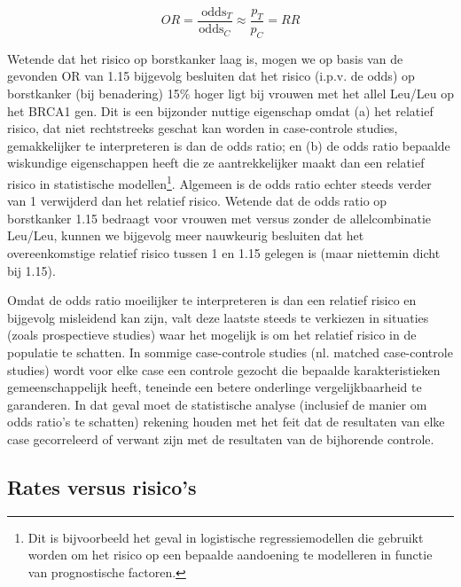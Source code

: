 \documentclass[
  12pt,dutch,coursenotes]{book}
\theoremstyle{definition}
\theoremstyle{definition}
\theoremstyle{definition}
\theoremstyle{remark}
\begin{document}
\begin{equation*}
OR=\frac{\mbox{ odds}_T}{\mbox{
odds}_C}\approx \frac{p_T}{p_C}=RR
\end{equation*}

Wetende dat het risico op borstkanker laag is, mogen we
op basis van de gevonden OR van 1.15 bijgevolg
besluiten dat het risico (i.p.v. de odds) op borstkanker (bij benadering) 15\% hoger ligt bij vrouwen met het allel Leu/Leu op het BRCA1 gen. Dit is een bijzonder
nuttige eigenschap omdat (a) het relatief risico, dat niet rechtstreeks
geschat kan worden in case-controle studies, gemakkelijker te interpreteren
is dan de odds ratio; en (b) de odds ratio bepaalde wiskundige eigenschappen
heeft die ze aantrekkelijker maakt dan een relatief risico in statistische
modellen\footnote{Dit is bijvoorbeeld het geval in logistische regressiemodellen die gebruikt worden om het
  risico op een bepaalde aandoening te modelleren in functie van prognostische
  factoren.}. Algemeen is de odds ratio echter steeds verder van 1 verwijderd
dan het relatief risico. Wetende dat de odds ratio op borstkanker 1.15
bedraagt voor vrouwen met versus zonder de allelcombinatie Leu/Leu, kunnen we bijgevolg meer
nauwkeurig besluiten dat het overeenkomstige relatief risico tussen 1 en 1.15
gelegen is (maar niettemin dicht bij 1.15).

Omdat de odds ratio moeilijker te interpreteren is dan een relatief risico
en bijgevolg misleidend kan zijn, valt deze laatste steeds te verkiezen in
situaties (zoals prospectieve studies) waar het mogelijk is om het relatief
risico in de populatie te schatten. In sommige case-controle studies (nl.
matched case-controle studies) wordt voor elke case een controle gezocht die
bepaalde karakteristieken gemeenschappelijk heeft, teneinde een betere
onderlinge vergelijkbaarheid te garanderen. In dat geval moet de
statistische analyse (inclusief de manier om odds ratio's te schatten)
rekening houden met het feit dat de resultaten van elke case gecorreleerd of
verwant zijn met de resultaten van de bijhorende controle.

\hypertarget{rates-versus-risicos}{%
\subsection{Rates versus risico's}\label{rates-versus-risicos}}
\end{document}
